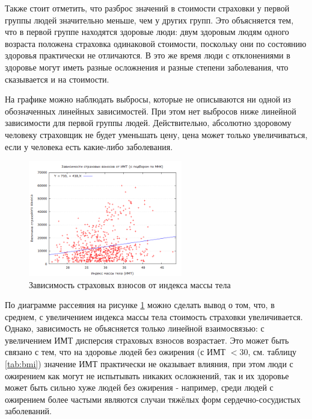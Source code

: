 \documentclass[a4paper,12pt]{article}
\begin{document}
Также стоит отметить, что разброс значений в стоимости страховки у первой группы людей значительно меньше, чем у других групп. Это объясняется тем, что в первой группе находятся здоровые люди: двум здоровым людям одного возраста положена страховка одинаковой стоимости, поскольку они по состоянию здоровья практически не отличаются. В это же время люди с отклонениями в здоровье могут иметь разные осложнения и разные степени заболевания, что сказывается и на стоимости.

На графике можно наблюдать выбросы, которые не описываются ни одной из обозначенных линейных зависимостей. При этом нет выбросов ниже линейной зависимости для первой группы людей. Действительно, абсолютно здоровому человеку страховщик не будет уменьшать цену, цена может только увеличиваться, если у человека есть какие-либо заболевания. 

\begin{figure}[H]
	\includegraphics[width=0.6\textwidth]{../[graphics]/сharges-bmi.png}
	\centering
	\caption{Зависимость страховых взносов от индекса массы тела}
	\label{fig:charges-bmi}
\end{figure}

По диаграмме рассеяния на рисунке \ref{fig:charges-bmi} можно сделать вывод о том, что, в среднем, с увеличением индекса массы тела стоимость страховки увеличивается. Однако, зависимость не объясняется только линейной взаимосвязью: с увеличением ИМТ дисперсия страховых взносов возрастает. Это может быть связано с тем, что на здоровье людей без ожирения (с ИМТ $<30$, см. таблицу \ref{tab:bmi}) значение ИМТ практически не оказывает влияния, при этом люди с ожирением как могут не испытывать никаких осложнений, так и их здоровье может быть сильно хуже людей без ожирения - например, среди людей с ожирением более частыми являются случаи тяжёлых форм сердечно-сосудистых заболеваний.
\end{document}
